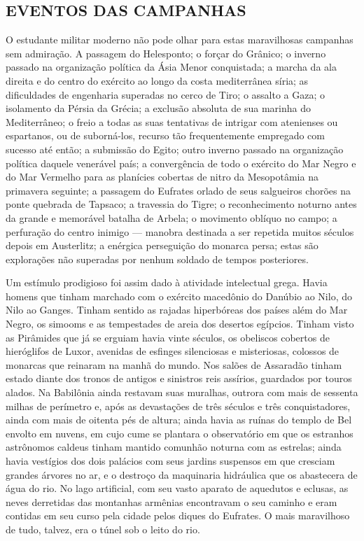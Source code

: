 \documentclass[11pt,a5paper,twoside,openany]{book}
\begin{document}
\subsection*{EVENTOS DAS CAMPANHAS}
O estudante militar moderno não pode olhar para estas maravilhosas campanhas sem admiração. A passagem do Helesponto; o forçar do Grânico; o inverno passado na organização política da Ásia Menor conquistada; a marcha da ala direita e do centro do exército ao longo da costa mediterrânea síria; as dificuldades de engenharia superadas no cerco de Tiro; o assalto a Gaza; o isolamento da Pérsia da Grécia; a exclusão absoluta de sua marinha do Mediterrâneo; o freio a todas as suas tentativas de intrigar com atenienses ou espartanos, ou de suborná-los, recurso tão frequentemente empregado com sucesso até então; a submissão do Egito; outro inverno passado na organização política daquele venerável país; a convergência de todo o exército do Mar Negro e do Mar Vermelho para as planícies cobertas de nitro da Mesopotâmia na primavera seguinte; a passagem do Eufrates orlado de seus salgueiros chorões na ponte quebrada de Tapsaco; a travessia do Tigre; o reconhecimento noturno antes da grande e memorável batalha de Arbela; o movimento oblíquo no campo; a perfuração do centro inimigo — manobra destinada a ser repetida muitos séculos depois em Austerlitz; a enérgica perseguição do monarca persa; estas são explorações não superadas por nenhum soldado de tempos posteriores.

Um estímulo prodigioso foi assim dado à atividade intelectual grega. Havia homens que tinham marchado com o exército macedônio do Danúbio ao Nilo, do Nilo ao Ganges. Tinham sentido as rajadas hiperbóreas dos países além do Mar Negro, os simooms e as tempestades de areia dos desertos egípcios. Tinham visto as Pirâmides que já se erguiam havia vinte séculos, os obeliscos cobertos de hieróglifos de Luxor, avenidas de esfinges silenciosas e misteriosas, colossos de monarcas que reinaram na manhã do mundo. Nos salões de Assaradão tinham estado diante dos tronos de antigos e sinistros reis assírios, guardados por touros alados. Na Babilônia ainda restavam suas muralhas, outrora com mais de sessenta milhas de perímetro e, após as devastações de três séculos e três conquistadores, ainda com mais de oitenta pés de altura; ainda havia as ruínas do templo de Bel envolto em nuvens, em cujo cume se plantara o observatório em que os estranhos astrônomos caldeus tinham mantido comunhão noturna com as estrelas; ainda havia vestígios dos dois palácios com seus jardins suspensos em que cresciam grandes árvores no ar, e o destroço da maquinaria hidráulica que os abastecera de água do rio. No lago artificial, com seu vasto aparato de aquedutos e eclusas, as neves derretidas das montanhas armênias encontravam o seu caminho e eram contidas em seu curso pela cidade pelos diques do Eufrates. O mais maravilhoso de tudo, talvez, era o túnel sob o leito do rio.
\end{document}
